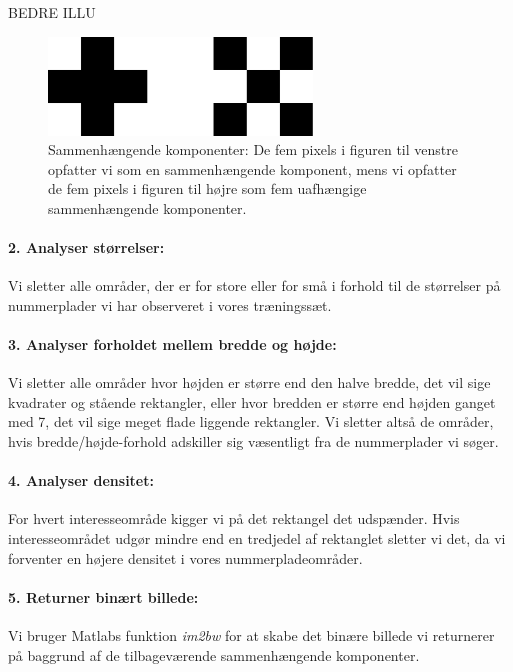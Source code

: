 BEDRE ILLU

\begin{figure}[htp]
\centering
\includegraphics[width=7cm]{implementation/illu/con_comp-connections.pdf}
\caption{Sammenhængende komponenter: De fem pixels i figuren til venstre opfatter vi som en sammenhængende komponent, mens vi opfatter de fem pixels i figuren til højre som fem uafhængige sammenhængende komponenter.}
\label{fig:con_comp-connections}
\end{figure}

\paragraph{2. Analyser størrelser:}
Vi sletter alle områder, der er for store eller for små i forhold til de størrelser på nummerplader vi har observeret i vores træningssæt.

\paragraph{3. Analyser forholdet mellem bredde og højde:}
Vi sletter alle områder hvor højden er større end den halve bredde, det vil sige kvadrater og stående rektangler, eller hvor bredden er større end højden ganget med 7, det vil sige meget flade liggende rektangler. Vi sletter altså de områder, hvis bredde/højde-forhold adskiller sig væsentligt fra de nummerplader vi søger.

\paragraph{4. Analyser densitet:}
For hvert interesseområde kigger vi på det rektangel det udspænder. Hvis interesseområdet udgør mindre end en tredjedel af rektanglet sletter vi det, da vi forventer en højere densitet i vores nummerpladeområder.

\paragraph{5. Returner binært billede:}
Vi bruger Matlabs funktion \textit{im2bw} for at skabe det binære billede vi returnerer på baggrund af de tilbageværende sammenhængende komponenter. 

